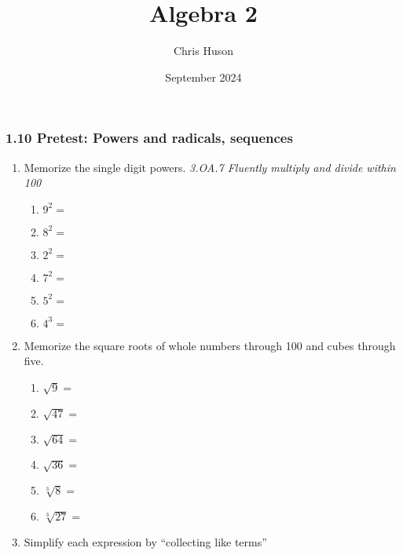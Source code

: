 \documentclass[12pt, twoside]{article}
\title{Algebra 2}
\author{Chris Huson}
\date{September 2024}
\begin{document}
\subsubsection*{1.10 Pretest: Powers and radicals, sequences}
\begin{enumerate}[itemsep=0.5cm]

\item Memorize the single digit powers. \hfill \emph{3.OA.7 Fluently multiply and divide within 100}
    \begin{multicols}{2}
        \begin{enumerate}[itemsep=0.5cm]
            \item $9^2 =$
            \item $8^2 =$
            \item $2^2 =$
            \item $7^2 =$
            \item $5^2 =$
            \item $4^3 =$
        \end{enumerate}
    \end{multicols}

\item Memorize the square roots of whole numbers through 100 and cubes through five.
    \begin{multicols}{2}
        \begin{enumerate}[itemsep=0.5cm]
            \item $\sqrt{9} =$
            \item $\sqrt{47} =$
            \item $\sqrt{64} =$
            \item $\sqrt{36} =$
            \item $\sqrt[3]{8} =$
            \item $\sqrt[3]{27} =$
          \end{enumerate}
    \end{multicols} \vspace{0.25cm}

\item Simplify each expression by ``collecting like terms''
\begin{enumerate}[itemsep=2cm]
    \end{enumerate}


\end{enumerate}
\end{document}
